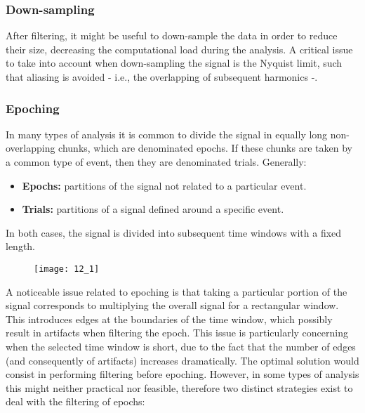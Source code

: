 \subsubsection{Down-sampling}
After filtering, it might be useful to down-sample the data in order to reduce their size, decreasing
the computational load during the analysis. A critical issue to
take into account when down-sampling the signal is the Nyquist limit, such that
aliasing is avoided - i.e., the overlapping of subsequent harmonics -.
\subsubsection{Epoching}
In many types of analysis it is common to divide the signal in equally long
non-overlapping chunks, which are denominated epochs. If these chunks are taken
by a common type of event, then they are denominated trials. Generally:
\begin{itemize}
    \item \textbf{Epochs:} partitions of the signal not related to a particular event.
    \item \textbf{Trials:} partitions of a signal defined around a specific event.
\end{itemize}
In both cases, the signal is divided into subsequent time windows with a fixed
length.
\begin{figure}[H]
    \centering
    \texttt{[image: 12\_1]}
\end{figure}
A noticeable issue related to epoching is that taking a particular portion of
the signal corresponds to multiplying the overall signal for a rectangular window.
This introduces edges at the boundaries of the time window, which possibly result
in artifacts when filtering the epoch. This issue is particularly concerning when
the selected time window is short, due to the fact that the number of edges
(and consequently of artifacts) increases dramatically.
The optimal solution would consist in performing filtering before epoching. However,
in some types of analysis this might neither practical nor feasible, therefore two
distinct strategies exist to deal with the filtering of epochs:
